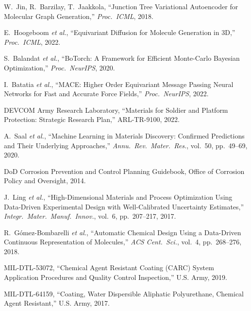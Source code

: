 \documentclass[11pt,letterpaper]{article}
\begin{document}
\begin{enumerate}[nosep, label={[\arabic*]}]

\item W.\ Jin, R.\ Barzilay, T.\ Jaakkola, ``Junction Tree Variational Autoencoder for Molecular Graph Generation,'' \textit{Proc.\ ICML}, 2018.

\item E.\ Hoogeboom \textit{et al.}, ``Equivariant Diffusion for Molecule Generation in 3D,'' \textit{Proc.\ ICML}, 2022.

\item S.\ Balandat \textit{et al.}, ``BoTorch: A Framework for Efficient Monte-Carlo Bayesian Optimization,'' \textit{Proc.\ NeurIPS}, 2020.

\item I.\ Batatia \textit{et al.}, ``MACE: Higher Order Equivariant Message Passing Neural Networks for Fast and Accurate Force Fields,'' \textit{Proc.\ NeurIPS}, 2022.

\item DEVCOM Army Research Laboratory, ``Materials for Soldier and Platform Protection: Strategic Research Plan,'' ARL-TR-9100, 2022.

\item A.\ Saal \textit{et al.}, ``Machine Learning in Materials Discovery: Confirmed Predictions and Their Underlying Approaches,'' \textit{Annu.\ Rev.\ Mater.\ Res.}, vol.\ 50, pp.\ 49--69, 2020.

\item DoD Corrosion Prevention and Control Planning Guidebook, Office of Corrosion Policy and Oversight, 2014.

\item J.\ Ling \textit{et al.}, ``High-Dimensional Materials and Process Optimization Using Data-Driven Experimental Design with Well-Calibrated Uncertainty Estimates,'' \textit{Integr.\ Mater.\ Manuf.\ Innov.}, vol.\ 6, pp.\ 207--217, 2017.

\item R.\ G\'omez-Bombarelli \textit{et al.}, ``Automatic Chemical Design Using a Data-Driven Continuous Representation of Molecules,'' \textit{ACS Cent.\ Sci.}, vol.\ 4, pp.\ 268--276, 2018.

\item MIL-DTL-53072, ``Chemical Agent Resistant Coating (CARC) System Application Procedures and Quality Control Inspection,'' U.S. Army, 2019.

\item MIL-DTL-64159, ``Coating, Water Dispersible Aliphatic Polyurethane, Chemical Agent Resistant,'' U.S. Army, 2017.


\end{enumerate}
\end{document}
